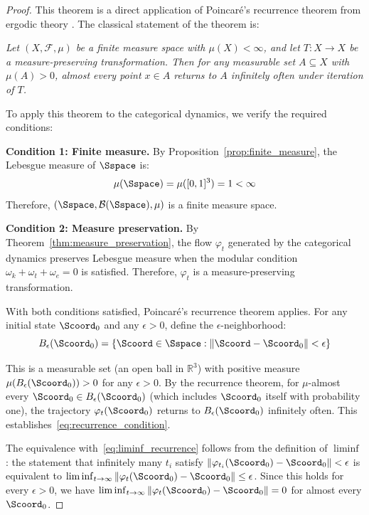 \begin{proof}
This theorem is a direct application of Poincaré's recurrence theorem from ergodic theory \citep{poincare1890probleme}. The classical statement of the theorem is:

\textit{Let $(X, \mathcal{F}, \mu)$ be a finite measure space with $\mu(X) < \infty$, and let $T: X \to X$ be a measure-preserving transformation. Then for any measurable set $A \subseteq X$ with $\mu(A) > 0$, almost every point $x \in A$ returns to $A$ infinitely often under iteration of $T$.}

To apply this theorem to the categorical dynamics, we verify the required conditions:

\textbf{Condition 1: Finite measure.} By Proposition~\ref{prop:finite_measure}, the Lebesgue measure of $\Sspace$ is:
\begin{equation}
\mu(\Sspace) = \mu([0,1]^3) = 1 < \infty
\end{equation}
Therefore, $(\Sspace, \mathcal{B}(\Sspace), \mu)$ is a finite measure space.

\textbf{Condition 2: Measure preservation.} By Theorem~\ref{thm:measure_preservation}, the flow $\varphi_t$ generated by the categorical dynamics preserves Lebesgue measure when the modular condition $\omega_k + \omega_t + \omega_e = 0$ is satisfied. Therefore, $\varphi_t$ is a measure-preserving transformation.

With both conditions satisfied, Poincaré's recurrence theorem applies. For any initial state $\Scoord_0$ and any $\epsilon > 0$, define the $\epsilon$-neighborhood:
\begin{equation}
B_\epsilon(\Scoord_0) = \{\Scoord \in \Sspace : \|\Scoord - \Scoord_0\| < \epsilon\}
\end{equation}

This is a measurable set (an open ball in $\mathbb{R}^3$) with positive measure $\mu(B_\epsilon(\Scoord_0)) > 0$ for any $\epsilon > 0$. By the recurrence theorem, for $\mu$-almost every $\Scoord_0 \in B_\epsilon(\Scoord_0)$ (which includes $\Scoord_0$ itself with probability one), the trajectory $\varphi_t(\Scoord_0)$ returns to $B_\epsilon(\Scoord_0)$ infinitely often. This establishes~\eqref{eq:recurrence_condition}.

The equivalence with~\eqref{eq:liminf_recurrence} follows from the definition of $\liminf$: the statement that infinitely many $t_i$ satisfy $\|\varphi_{t_i}(\Scoord_0) - \Scoord_0\| < \epsilon$ is equivalent to $\liminf_{t \to \infty} \|\varphi_t(\Scoord_0) - \Scoord_0\| \leq \epsilon$. Since this holds for every $\epsilon > 0$, we have $\liminf_{t \to \infty} \|\varphi_t(\Scoord_0) - \Scoord_0\| = 0$ for almost every $\Scoord_0$.
\end{proof}

